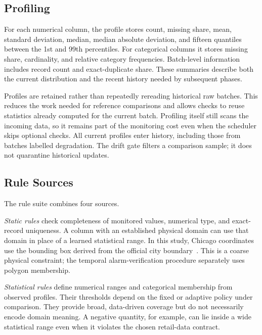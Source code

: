 \begin{figure}[t]
\label{fig:loop}
\end{figure}

\subsection{Profiling}

For each numerical column, the profile stores count, missing share, mean, standard deviation, median, median absolute deviation, and fifteen quantiles between the 1st and 99th percentiles. For categorical columns it stores missing share, cardinality, and relative category frequencies. Batch-level information includes record count and exact-duplicate share. These summaries describe both the current distribution and the recent history needed by subsequent phases.

Profiles are retained rather than repeatedly rereading historical raw batches. This reduces the work needed for reference comparisons and allows checks to reuse statistics already computed for the current batch. Profiling itself still scans the incoming data, so it remains part of the monitoring cost even when the scheduler skips optional checks. All current profiles enter history, including those from batches labelled degradation. The drift gate filters a comparison sample; it does not quarantine historical updates.

\subsection{Rule Sources}
\label{sec:method:rules}

The rule suite combines four sources.

\emph{Static rules} check completeness of monitored values, numerical type, and exact-record uniqueness. A column with an established physical domain can use that domain in place of a learned statistical range. In this study, Chicago coordinates use the bounding box derived from the official city boundary~\cite{ChicagoBoundary}. This is a coarse physical constraint; the temporal alarm-verification procedure separately uses polygon membership.

\emph{Statistical rules} define numerical ranges and categorical membership from observed profiles. Their thresholds depend on the fixed or adaptive policy under comparison. They provide broad, data-driven coverage but do not necessarily encode domain meaning. A negative quantity, for example, can lie inside a wide statistical range even when it violates the chosen retail-data contract.

